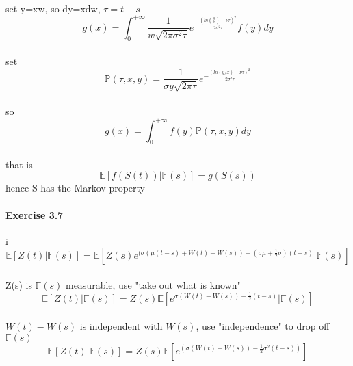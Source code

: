 \documentclass{article}
\begin{document}
\paragraph{}{set y=xw, so dy=xdw, $\tau =t-s$}
\begin{displaymath}
  g(x)=\int_{0}^{+\infty}\frac{1}{w\sqrt{2\pi\sigma^2\tau}}e^{-\frac{(ln(\frac{y}{x})-\nu\tau)^2}{2\sigma^2\tau}}f(y)dy
\end{displaymath}
\paragraph{}{set \begin{displaymath}
                   \mathbb{P}(\tau,x,y)=\frac{1}{\sigma y \sqrt{2\pi \tau}}e^{-\frac{(ln(y/x)-\nu \tau)^2}{2\sigma^2\tau}}
                 \end{displaymath}}
\paragraph{}{so \begin{displaymath}
                  g(x)=\int_{0}^{+\infty}f(y)\mathbb{P}(\tau,x,y)dy
                \end{displaymath}}
\paragraph{}{that is \begin{displaymath}
                       \mathbb{E}[f(S(t))|\mathbb{F}(s)]=g(S(s))
                     \end{displaymath}hence S has the Markov property}
\paragraph{Exercise 3.7}{i}
\begin{displaymath}
  \mathbb{E}[Z(t)|\mathbb{F}(s)]=\mathbb{E}[Z(s)e^{(\sigma(\mu(t-s)+W(t)-W(s))-(\sigma\mu+\frac{1}{2}\sigma)(t-s)}|\mathbb{F}(s)]
\end{displaymath}
\paragraph{}{Z(s) is $\mathbb{F}(s)$ measurable, use "take out what is known"}
\begin{displaymath}
  \mathbb{E}[Z(t)|\mathbb{F}(s)]=Z(s)\mathbb{E}[e^{\sigma(W(t)-W(s))-\frac{1}{2}(t-s)}|\mathbb{F}(s)]
\end{displaymath}
\paragraph{}{$W(t)-W(s)$ is independent with $W(s)$, use "independence" to drop off $\mathbb{F}(s)$}
\begin{displaymath}
  \mathbb{E}[Z(t)|\mathbb{F}(s)]=Z(s)\mathbb{E}[e^{(\sigma(W(t)-W(s))-\frac{1}{2}\sigma^2(t-s))}]
\end{displaymath}
\end{document}
